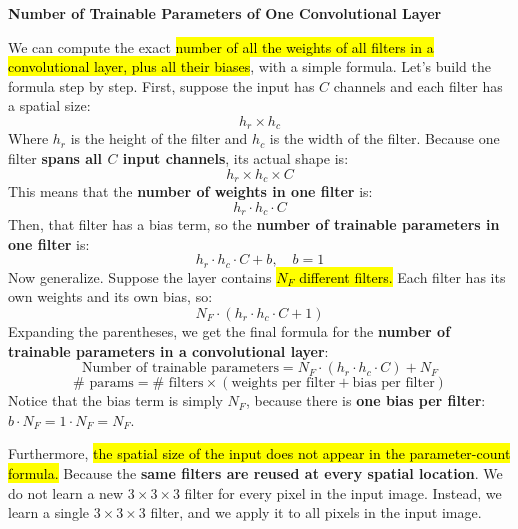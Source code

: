 \begin{flushleft}
    \textcolor{Green3}{ \textbf{Number of Trainable Parameters of One Convolutional Layer}}
\end{flushleft}
We can compute the exact \hl{number of all the weights of all filters in a convolutional layer, plus all their biases}, with a simple formula. Let's build the formula step by step. First, suppose the input has $C$ channels and each filter has a spatial size:
\begin{equation*}
    h_r \times h_c
\end{equation*}
Where $h_r$ is the height of the filter and $h_c$ is the width of the filter. Because one filter \textbf{spans all $C$ input channels}, its actual shape is:
\begin{equation*}
    h_r \times h_c \times C
\end{equation*}
This means that the \textbf{number of weights in one filter} is:
\begin{equation*}
    h_r \cdot h_c \cdot C
\end{equation*}
Then, that filter has a bias term, so the \textbf{number of trainable parameters in one filter} is:
\begin{equation*}
    h_r \cdot h_c \cdot C + b, \quad b = 1
\end{equation*}
Now generalize. Suppose the layer contains \hl{$N_F$ different filters.} Each filter has its own weights and its own bias, so:
\begin{equation*}
    N_F \cdot \left(h_r \cdot h_c \cdot C + 1\right)
\end{equation*}
Expanding the parentheses, we get the final formula for the \textbf{number of trainable parameters in a convolutional layer}:
\begin{equation}\label{eq:number-of-trainable-parameters-in-a-convolutional-layer}
    \text{Number of trainable parameters} = N_F \cdot \left(h_r \cdot h_c \cdot C\right) + N_F
\end{equation}
\begin{equation*}
    \# \text{ params} = \# \text{ filters} \times \left(\text{weights per filter} + \text{bias per filter}\right)
\end{equation*}
Notice that the bias term is simply $N_F$, because there is \textbf{one bias per filter}: $b \cdot N_F = 1 \cdot N_F = N_F$.

\highspace
Furthermore, \hl{the spatial size of the input does not appear in the parameter-count formula.} Because the \textbf{same filters are reused at every spatial location}. We do not learn a new $3 \times 3 \times 3$ filter for every pixel in the input image. Instead, we learn a single $3 \times 3 \times 3$ filter, and we apply it to all pixels in the input image.

